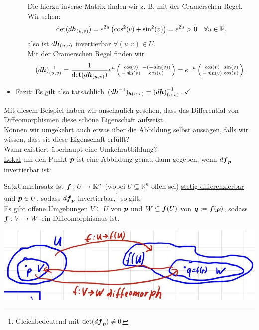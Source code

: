 \begin{Beispiel}
\begin{itemize}
\begin{itemize}
\begin{equation*}
        \end{equation*}
        Die hierzu inverse Matrix finden wir z. B. mit der Cramerschen Regel. Wir sehen:
        \begin{equation*}
            \det (d{{\text{\boldmath${h}$}}}_{(u,v)})=e^{2u}\left({\cos^2(v)+\sin^2(v)}\right)=e^{2u}>0\quad \forall u\in \mathbb{R},
        \end{equation*}
        also ist $d{{\text{\boldmath${h}$}}}_{(u,v)}$ invertierbar $\forall (u,v)\in U$.\\
        Mit der Cramerschen Regel finden wir
        \begin{equation*}
            (d{{\text{\boldmath${h}$}}})^{-1}_{(u,v)}=\frac{1}{\det(d{{\text{\boldmath${h}$}}}_{(u,v)})}e^u\left(\begin{smallmatrix}\cos(v)&-(-\sin(v))\\-\sin(v)&\cos(v)\end{smallmatrix}\right)=e^{-u}\left(\begin{smallmatrix}\cos(v)&\sin(v)\\-\sin(v)&\cos(v)\end{smallmatrix}\right).
        \end{equation*}
    \end{itemize}
    \item Fazit: Es gilt also tatsächlich $(d{{\text{\boldmath${h}$}}}^{-1})_{{{\text{\boldmath${h}$}}}(u,v)}=\left({d{{\text{\boldmath${h}$}}}}\right)^{-1}_{(u,v)}$. $\checkmark$
\end{itemize}
\end{Beispiel}
Mit diesem Beispiel haben wir anschaulich gesehen, dass das Differential von Diffeomorphismen diese schöne Eigenschaft aufweist.\\
Können wir umgekehrt auch etwas über die Abbildung selbst aussagen, falls wir wissen, dass sie diese Eigenschaft erfüllt?\\
Wann existiert überhaupt eine Umkehrabbildung?\\
\underline{Lokal} um den Punkt ${{\text{\boldmath${p}$}}}$ ist eine Abbildung genau dann gegeben, wenn $d{{\text{\boldmath${f}$}}}_{{\text{\boldmath${p}$}}}$ invertierbar ist:
\begin{Satz}
{Satz}{Umkehrsatz}
Ist ${{\text{\boldmath${f}$}}}:U\to\mathbb{R}^n$ (wobei $U\subseteq\mathbb{R}^n$ offen sei) \underline{stetig differenzierbar} und ${{\text{\boldmath${p}$}}}\in U$, sodass $d{{\text{\boldmath${f}$}}}_{{\text{\boldmath${p}$}}}$ invertierbar,\footnote{Gleichbedeutend mit $\det (d{{\text{\boldmath${f}$}}}_{{\text{\boldmath${p}$}}})\neq0$} so gilt:\\
Es gibt offene Umgebungen $V\subseteq U$ von ${{\text{\boldmath${p}$}}}$ und $W\subseteq {{\text{\boldmath${f}$}}}(U)$ von ${{\text{\boldmath${q}$}}}:={{\text{\boldmath${f}$}}}({{\text{\boldmath${p}$}}})$, sodass ${{\text{\boldmath${f}$}}}:V\to W$ ein Diffeomorphismus ist.\\
\begin{center}
    \includegraphics[width=.5\textwidth]{Dateien/09/09Umkehrsatz.jpg}
\end{center}
\end{Satz}
